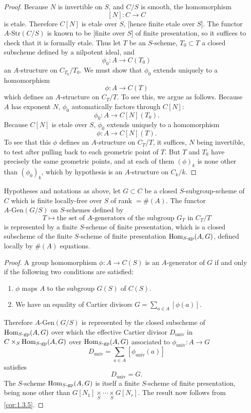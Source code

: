 \begin{proof}
Because $N$ is invertible on $S$, and $C/S$ is smooth, the homomorphism
\[
[N] : C \to C
\]
is etale. Therefore $C[N]$ is etale over $S$, [hence finite etale over $S$]. The functor $A\text{-}\mathrm{Str}(C/S)$ is known to be [finite over $S$] of finite presentation, so it suffices to check that it is formally etale. Thus let $T$ be an $S$-scheme, $T_0 \subset T$ a closed subscheme defined by a nilpotent ideal, and
\[
\phi_0 : A \to C(T_0)
\]
an $A$-structure on $C_{T_0}/T_0$. We must show that $\phi_0$ extends uniquely to a homomorphism
\[
\phi : A \to C(T)
\]
which defines an $A$-structure on $C_T/T$. To see this, we argue as follows. Because $A$ has exponent $N$, $\phi_0$ automatically factors through $C[N]$:
\[
\phi_0 : A \to C[N](T_0).
\]
Because $C[N]$ is etale over $S$, $\phi_0$ extends uniquely to a homomorphism
\[
\phi : A \to C[N](T).
\]
To see that this $\phi$ defines an $A$-structure on $C_T/T$, it suffices, $N$ being invertible, to test after pulling back to each geometric point of $T$. But $T$ and $T_0$ have precisely the same geometric points, and at each of them $(\phi)_k$ is none other than $(\phi_0)_k$, which by hypothesis is an $A$-structure on $C_k/k$.
\end{proof}

\begin{proposition}\label{prop:1.6.5}
Hypotheses and notations as above, let $G \subset C$ be a closed $S$-subgroup-scheme of $C$ which is finite locally-free over $S$ of rank $= \#(A)$. The functor $A\text{-}\mathrm{Gen}(G/S)$ on $S$-schemes defined by
\[
T \mapsto \text{the set of $A$-generators of the subgroup $G_T$ in } C_T/T
\]
is represented by a finite $S$-scheme of finite presentation, which is a closed subscheme of the finite $S$-scheme of finite presentation $\operatorname{Hom}_{S\text{-}\mathrm{gp}}(A, G)$, defined locally by $\#(A)$ equations.
\end{proposition}

\begin{proof}
A group homomorphism $\phi : A \to C(S)$ is an $A$-generator of $G$ if and only if the following two conditions are satisfied:
\begin{enumerate}[(1)]
\item $\phi$ maps $A$ to the subgroup $G(S)$ of $C(S)$.
\item We have an equality of Cartier divisors $G = \sum_{a \in A} [\phi(a)]$.
\end{enumerate}
Therefore $A\text{-}\mathrm{Gen}(G/S)$ is represented by the closed subscheme of $\operatorname{Hom}_{S\text{-}\mathrm{gp}}(A, G)$ over which the effective Cartier divisor $D_{\mathrm{univ}}$ in $C \times_S \operatorname{Hom}_{S\text{-}\mathrm{gp}}(A, G)$ over $\operatorname{Hom}_{S\text{-}\mathrm{gp}}(A, G)$ associated to $\phi_{\mathrm{univ}} : A \to G$
\[
D_{\mathrm{univ}} = \sum_{a \in A} [\phi_{\mathrm{univ}}(a)]
\]
satisfies
\[
D_{\mathrm{univ}} = G.
\]
The $S$-scheme $\operatorname{Hom}_{S\text{-}\mathrm{gp}}(A, G)$ is itself a finite $S$-scheme of finite presentation, being none other than $G[N_1] \underset{S}{\times} \cdots \underset{S}{\times} G[N_r]$. The result now follows from \ref{cor:1.3.5}.
\end{proof}

